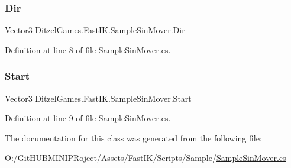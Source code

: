 \subsubsection{\texorpdfstring{Dir}{Dir}}
{\footnotesize\ttfamily Vector3 Ditzel\+Games.\+Fast\+I\+K.\+Sample\+Sin\+Mover.\+Dir}



Definition at line 8 of file Sample\+Sin\+Mover.\+cs.

\mbox{\label{class_ditzel_games_1_1_fast_i_k_1_1_sample_sin_mover_abf720afbe44517fe8f1bbacd7e05e8d2}} 
\subsubsection{\texorpdfstring{Start}{Start}}
{\footnotesize\ttfamily Vector3 Ditzel\+Games.\+Fast\+I\+K.\+Sample\+Sin\+Mover.\+Start}



Definition at line 9 of file Sample\+Sin\+Mover.\+cs.



The documentation for this class was generated from the following file\+:\begin{DoxyCompactItemize}
\item 
O\+:/\+Git\+H\+U\+B\+M\+I\+N\+I\+P\+Roject/\+Assets/\+Fast\+I\+K/\+Scripts/\+Sample/\mbox{\hyperlink{_sample_sin_mover_8cs}{Sample\+Sin\+Mover.\+cs}}\end{DoxyCompactItemize}
